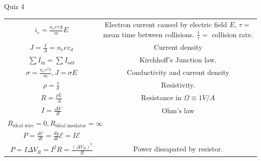 \documentclass{article}
\begin{document}
\begin{center}
\begin{section}{Quiz 4}
\begin{tabular}{|c|c|}
		 $i_e = \frac{n_e e \tau A}{m} E$                                                       & \makecell{Electron current caused by electric field $E$,            \\
		 $\tau=$ mean time between collisions. $\frac{1}{\tau}=$ collision rate.}                                                                                     \\

		 $J = \frac{I}{A} = n_e e v_d$                                                          & Current density                                                     \\

		 $\sum I_\text{in} = \sum I_\text{out}$                                                 & Kirchhoff's Junction law.                                           \\

		 $\sigma = \frac{n_e e^2 \tau}{m}, J = \sigma E$                                        & Conductivity and current density                                    \\

		 $\rho = \frac{1}{\sigma}$                                                              & Resistivity.                                                        \\


		 $R = \frac{\rho L}{A}$                                                                 & Resistance in $\Omega \equiv 1 V/A$                                 \\

		 $I = \frac{\Delta V}{R}$                                                               & Ohm's law                                                           \\

		 $R_\text{ideal wire} = 0, R_\text{ideal insulator} = \infty$                           &                                                                     \\

		 $P = \frac{dU}{dt} = \frac{dq}{dt} \mathcal E = I \mathcal E$                          &                                                                     \\

		 $P = I \Delta V_R = I^2 R = \frac{(\Delta V_R)^2}{R}$                                  & Power dissapated by resistor.                                       \\


\end{tabular}
\end{section}
\end{center}
\end{document}
